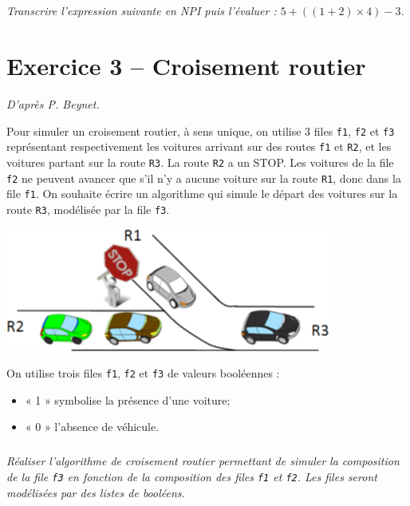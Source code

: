 \subparagraph{}
\textit{Transcrire l'expression suivante en NPI puis l'évaluer : $5+\left(\left( 1+2\right)\times4 \right)-3$.}

\section*{Exercice 3 -- Croisement routier}
\setcounter{exo}{0}
\textit{D'après P. Beynet.}

Pour simuler un croisement routier, à sens unique, on utilise 3 files \texttt{f1}, \texttt{f2} et \texttt{f3} représentant respectivement les voitures arrivant sur des routes \texttt{f1} et \texttt{R2}, et les voitures partant sur la route \texttt{R3}.
La route \texttt{R2} a un STOP. Les voitures de la file \texttt{f2} ne peuvent avancer que s’il n’y a aucune voiture sur la route \texttt{R1}, donc dans la file \texttt{f1}. On souhaite écrire un algorithme qui simule le départ des voitures sur la route \texttt{R3}, modélisée par la file \texttt{f3}.
\begin{center}
\includegraphics[width=.8\linewidth]{images/file_01}
\end{center}
On utilise trois files \texttt{f1}, \texttt{f2} et \texttt{f3} de valeurs booléennes :
\begin{itemize}
\item  « 1 » symbolise la présence d’une voiture;
\item  « 0 » l’absence de véhicule.
\end{itemize}

\subparagraph{}
\textit{Réaliser l'algorithme de croisement routier permettant de simuler la composition de la file \texttt{f3} en fonction de la composition des files \texttt{f1} et \texttt{f2}. Les files seront modélisées par des listes de booléens.}
%
%
%

